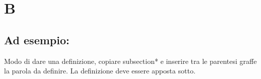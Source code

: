 \section*{B}
\markright{}
\subsection*{Ad esempio:}
Modo di dare una definizione, copiare subsection*{} e inserire tra le parentesi graffe la parola da definire. La definizione deve essere apposta sotto.